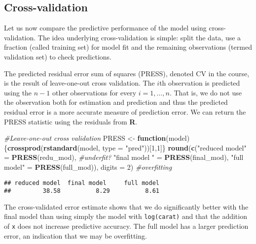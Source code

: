 \documentclass[]{book}
\newenvironment{Shaded}{\begin{snugshade}}{\end{snugshade}}
\newcommand{\CommentTok}[1]{\textcolor[rgb]{0.56,0.35,0.01}{\textit{#1}}}
\newcommand{\ControlFlowTok}[1]{\textcolor[rgb]{0.13,0.29,0.53}{\textbf{#1}}}
\newcommand{\DataTypeTok}[1]{\textcolor[rgb]{0.13,0.29,0.53}{#1}}
\newcommand{\DecValTok}[1]{\textcolor[rgb]{0.00,0.00,0.81}{#1}}
\newcommand{\KeywordTok}[1]{\textcolor[rgb]{0.13,0.29,0.53}{\textbf{#1}}}
\newcommand{\NormalTok}[1]{#1}
\newcommand{\StringTok}[1]{\textcolor[rgb]{0.31,0.60,0.02}{#1}}
\theoremstyle{definition}
\theoremstyle{definition}
\theoremstyle{definition}
\theoremstyle{remark}
\begin{document}
\hypertarget{cross-validation}{%
\subsection{Cross-validation}\label{cross-validation}}

Let us now compare the predictive performance of the model using cross-validation. The idea underlying cross-validation is simple: split the data, use a fraction (called training set) for model fit and the remaining observations (termed validation set) to check predictions.

The predicted residual error sum of squares (PRESS), denoted \(\mathrm{CV}\) in the course, is the result of leave-one-out cross validation. The \(i\)th observation is predicted using the \(n-1\) other observations for every \(i=1, \ldots, n\). That is, we do not use the observation both for estimation and prediction and thus the predicted residual error is a more accurate measure of prediction error. We can return the PRESS statistic using the residuals from \textbf{R}.

\begin{Shaded}
\begin{Highlighting}[]
\CommentTok{#Leave-one-out cross validation}
\NormalTok{PRESS <-}\StringTok{ }\ControlFlowTok{function}\NormalTok{(model)\{}\KeywordTok{crossprod}\NormalTok{(}\KeywordTok{rstandard}\NormalTok{(model, }\DataTypeTok{type =} \StringTok{"pred"}\NormalTok{))[}\DecValTok{1}\NormalTok{,}\DecValTok{1}\NormalTok{]\}}
\KeywordTok{round}\NormalTok{(}\KeywordTok{c}\NormalTok{(}\StringTok{"reduced model"}\NormalTok{ =}\StringTok{ }\KeywordTok{PRESS}\NormalTok{(redu_mod), }\CommentTok{#underfit?}
        \StringTok{"final model "}\NormalTok{ =}\StringTok{ }\KeywordTok{PRESS}\NormalTok{(final_mod),}
        \StringTok{"full model"}\NormalTok{ =}\StringTok{ }\KeywordTok{PRESS}\NormalTok{(full_mod)),}
  \DataTypeTok{digits =} \DecValTok{2}\NormalTok{) }\CommentTok{#overfitting}
\end{Highlighting}
\end{Shaded}

\begin{verbatim}
## reduced model  final model     full model 
##         38.58          8.29          8.61
\end{verbatim}

The cross-validated error estimate shows that we do significantly better with the final model than using simply the model with \texttt{log(carat)} and that the addition of \texttt{x} does not increase predictive accuracy. The full model has a larger prediction error, an indication that we may be overfitting.
\end{document}
